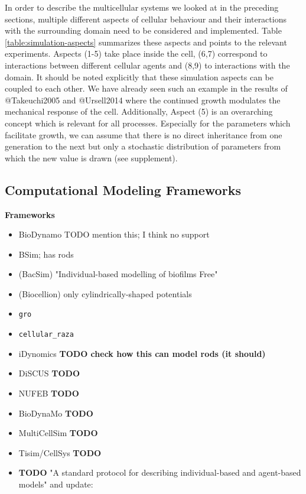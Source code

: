 \documentclass{article}
\begin{document}
In order to describe the multicellular systems we looked at in the preceding sections, multiple
different aspects of cellular behaviour and their interactions with the surrounding domain need to
be considered and implemented.
Table \ref{table:simulation-aspects} summarizes these aspects and points to the relevant
experiments.
Aspects (1-5) take place inside the cell, (6,7) correspond to interactions between different
cellular agents and (8,9) to interactions with the domain.
It should be noted explicitly that these simulation aspects can be coupled to each other.
We have already seen such an example in the results of @Takeuchi2005 and @Ursell2014 where the
continued growth modulates the mechanical response of the cell.
Additionally, Aspect (5) is an overarching concept which is relevant for all processes.
Especially for the parameters which facilitate growth, we can assume that there is no direct
inheritance from one generation to the next but only a stochastic distribution of parameters from
which the new value is drawn (see supplement).

\subsection{Computational Modeling Frameworks}

\textbf{Frameworks}
\begin{itemize}
    \item \cite{breitwieser_biodynamo_2022} BioDynamo TODO mention this; I think no support
    \item \cite{Gorochowski2012,Matyjaszkiewicz2017} BSim; has rods
    \item \cite{Kreft1998,Kreft2001} (BacSim) "Individual-based modelling of biofilms Free"
    \item \cite{Kang2014} (Biocellion) only cylindrically-shaped potentials
    \item \cite{Gutirrez2017} \texttt{gro}
    \item \cite{Pleyer2025} \texttt{cellular\_raza}
    \item \cite{Bogdanowski2022} iDynomics \textbf{TODO check how this can model rods (it should)}
    \item \cite{GoiMoreno2015} DiSCUS \textbf{TODO}
    \item \cite{Li2019} NUFEB \textbf{TODO}
    \item \cite{Breitwieser2021} BioDynaMo \textbf{TODO}
    \item \cite{Dang2020} MultiCellSim \textbf{TODO}
    \item \cite{Hoehme2010} Tisim/CellSys \textbf{TODO}
    \item \cite{Grimm2006,Grimm2010} \textbf{TODO} "A standard protocol for describing individual-based and
        agent-based models" and update: \cite{Jang2012}
\end{itemize}
\end{document}
